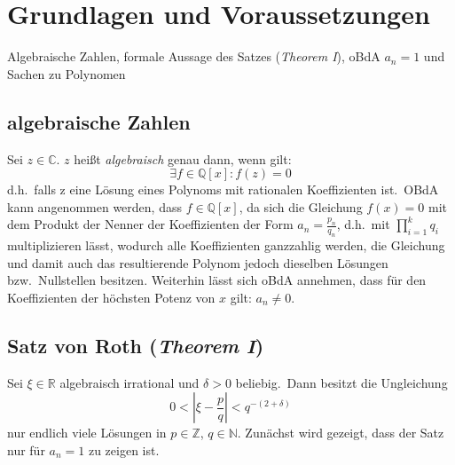\documentclass[11pt]{article}
\begin{document}
    \section{Grundlagen und Voraussetzungen}
    \label{sec:basics}
        Algebraische Zahlen, formale Aussage des Satzes (\emph{Theorem I}), oBdA $a_n = 1$ und Sachen zu Polynomen
        
        \subsection{algebraische Zahlen}
        \label{subsec:algebraic-numbers}
            \textrm{Sei $z \in \mathbb{C}$. $z$ heißt \emph{algebraisch} genau dann, wenn gilt:}
            \begin{equation}
                \exists f \in \mathbb{Q}[x] : f(z) = 0 \label{eq:def-algebraic}
            \end{equation}
            \textrm{d.h.\ falls z eine Lösung eines Polynoms mit rationalen Koeffizienten ist.\ OBdA kann angenommen
            werden, dass $f \in \mathbb{Q}[x]$, da sich die Gleichung $f(x) = 0$ mit dem Produkt der Nenner der
            Koeffizienten der Form $a_n = \frac{p_n}{q_n}$, d.h.\ mit $\prod_{i=1}^k q_i$ multiplizieren lässt, wodurch
            alle Koeffizienten ganzzahlig werden, die Gleichung und damit auch das resultierende Polynom jedoch dieselben
            Lösungen bzw.\ Nullstellen besitzen.
            \newline
            Weiterhin lässt sich oBdA annehmen, dass für den Koeffizienten der höchsten Potenz von $x$ gilt: $a_n \neq 0$.}
        
        \subsection{Satz von Roth (\emph{Theorem I})}
        \label{subsec:th1}
            Sei $\xi \in \mathbb{R}$ algebraisch irrational und $\delta > 0$ beliebig.\ Dann besitzt die Ungleichung
            \begin{equation}
                0 < | \xi - \frac{p}{q} | < q^{-(2+\delta)} \label{eq:svr}
            \end{equation}
            \textrm{nur endlich viele Lösungen in $p \in \mathbb{Z}$, $q \in \mathbb{N}$.
            \newline \newline
            Zunächst wird gezeigt, dass der Satz nur für $a_n = 1$ zu zeigen ist.}
        
\end{document}
